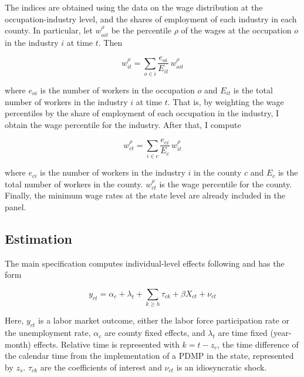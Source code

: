 \documentclass[12pt,a4paper]{article}
\begin{document}
The indices are obtained using the data on the wage distribution at the occupation-industry level, and the shares of employment of each industry in each county. 
In particular, let \(w^{\rho}_{oit}\) be the percentile \(\rho\) of the wages at the occupation \(o\) in the industry \(i\) at time \(t\). 
Then

\begin{equation}
    w^{\rho}_{it} = \sum_{o\in i} \dfrac{e_{oi}}{E_{it}}\,w^{\rho}_{oit}
\end{equation}
    
where \(e_{oi}\) is the number of workers in the occupation \(o\) and \(E_{it}\) is the total number of workers in the industry \(i\) at time \(t\).
That is, by weighting the wage percentiles by the share of employment of each occupation in the industry, I obtain the wage percentile for the industry.
After that, I compute

\begin{equation}
    w^{\rho}_{ct} = \sum_{i\in c} \dfrac{e_{ci}}{E_c}\,w^{\rho}_{it}
\end{equation}

where \(e_{ci}\) is the number of workers in the industry \(i\) in the county \(c\) and \(E_c\) is the total number of workers in the county.
\(w^{\rho}_{ct}\) is the wage percentile for the county.
Finally, the minimum wage rates at the state level are already included in the panel.

\subsection*{Estimation}

The main specification computes individual-level effects following \textcite{Arkhangelsky2024} and has the form

\begin{equation}
    y_{ct} = \alpha_c + \lambda_t + \sum_{k\geq h}\tau_{ck} + \beta X_{ct} + \nu_{ct}
\end{equation}

Here, \(y_{ct}\) is a labor market outcome, either the labor force participation rate or the unemployment rate, \(\alpha_c\) are county fixed effects, and \(\lambda_t\) are time fixed (year-month) effects.
Relative time is represented with \(k = t - z_c\), the time difference of the calendar time from the implementation of a PDMP in the state, represented by \(z_s\).
\(\tau_{ck}\) are the coefficients of interest and \(\nu_{ct}\) is an idiosyncratic shock.
\end{document}
